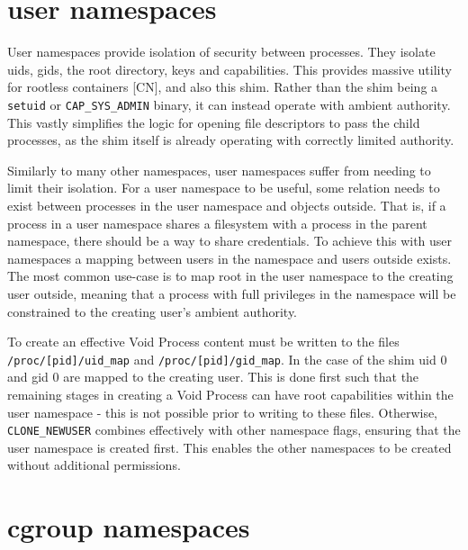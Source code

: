 \documentclass[12pt,a4paper,twoside]{report}
\begin{document}

\section{user namespaces}
\label{sec:voiding-user}

User namespaces provide isolation of security between processes. They isolate uids, gids, the root directory, keys and capabilities. This provides massive utility for rootless containers [CN], and also this shim. Rather than the shim being a \texttt{setuid} or \texttt{CAP\_SYS\_ADMIN} binary, it can instead operate with ambient authority. This vastly simplifies the logic for opening file descriptors to pass the child processes, as the shim itself is already operating with correctly limited authority.

Similarly to many other namespaces, user namespaces suffer from needing to limit their isolation. For a user namespace to be useful, some relation needs to exist between processes in the user namespace and objects outside. That is, if a process in a user namespace shares a filesystem with a process in the parent namespace, there should be a way to share credentials. To achieve this with user namespaces a mapping between users in the namespace and users outside exists. The most common use-case is to map root in the user namespace to the creating user outside, meaning that a process with full privileges in the namespace will be constrained to the creating user's ambient authority.

To create an effective Void Process content must be written to the files \texttt{/proc/[pid]/uid\_map} and \texttt{/proc/[pid]/gid\_map}. In the case of the shim uid 0 and gid 0 are mapped to the creating user. This is done first such that the remaining stages in creating a Void Process can have root capabilities within the user namespace - this is not possible prior to writing to these files. Otherwise, \texttt{CLONE\_NEWUSER} combines effectively with other namespace flags, ensuring that the user namespace is created first. This enables the other namespaces to be created without additional permissions.


\section{cgroup namespaces}
\label{sec:voiding-cgroup}
\end{document}
